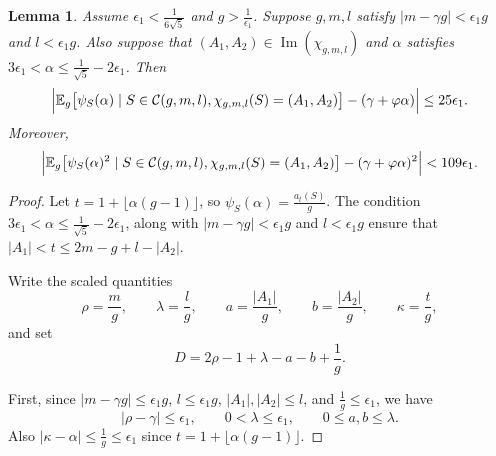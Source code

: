 \documentclass[12pt]{amsart}
\def\E{{\mathbb E}}
\renewcommand{\phi}{\varphi}
\newcommand{\cC}{\mathcal{C}}
\def\Ima{{\operatorname{Im}}}
\newtheorem{lemma}[theorem]{Lemma}
\begin{document}
\begin{lemma}\label{Lem: depth 3 fix A1 A2}
Assume $\epsilon_1< \frac{1}{6\sqrt{5}}$ and $g>\frac{1}{\epsilon_1}$.
Suppose $g,m,l$ satisfy $|m-\gamma g|<\epsilon_1 g$ and $l<\epsilon_1 g$.  Also suppose that $(A_1,A_2)\in \Ima(\chi_{g,m,l})$ and $\alpha$ satisfies $3\epsilon_1< \alpha \leq \frac{1}{\sqrt{5}} -2\epsilon_1$.
Then
\[
\Bigl|\E_g \big[\psi_S(\alpha)\mid S\in \cC(g,m,l), \chi_{g,m,l}(S)=(A_1,A_2) \big]-(\gamma+\phi\alpha)\Bigr|
\leq 25\epsilon_1. 
\]
Moreover,
\[
\Bigl|\E_g \big[\psi_S(\alpha)^2\mid S\in \cC(g,m,l), \chi_{g,m,l}(S)=(A_1,A_2) \big]-(\gamma+\phi\alpha)^2\Bigr|
< 109\epsilon_1. 
\]
\end{lemma}
\begin{proof}
Let $t=1+\lfloor\alpha(g-1)\rfloor$, so $\psi_S(\alpha)= \frac{a_{t}(S)}{g}$. The condition $3\epsilon_1< \alpha \leq \frac{1}{\sqrt{5}} -2\epsilon_1$, along with $|m-\gamma g|<\epsilon_1 g$ and $l<\epsilon_1 g$ ensure that $|A_1|<t\leq 2m-g+l-|A_2|$.

Write the scaled quantities
\[
\rho=\frac{m}{g},\qquad \lambda=\frac{l}{g},\qquad
a=\frac{|A_1|}{g},\qquad b=\frac{|A_2|}{g},\qquad
\kappa=\frac{t}{g},
\]
and set
\[D=2\rho-1+\lambda-a-b+\frac{1}{g}.\]

First, since $|m-\gamma g|\leq \epsilon_1 g$, $l\leq \epsilon_1 g$, $|A_1|,|A_2|\leq l$, and $\frac{1}{g} \leq \epsilon_1$, we have
\[
|\rho-\gamma|\leq \epsilon_1,\qquad
0 < \lambda\leq \epsilon_1,\qquad
0\leq a,b\leq \lambda.
\]
Also $|\kappa-\alpha|\leq \frac{1}{g}\leq \epsilon_1$ since $t=1+\lfloor\alpha(g-1)\rfloor$.


\end{proof}
\end{document}
